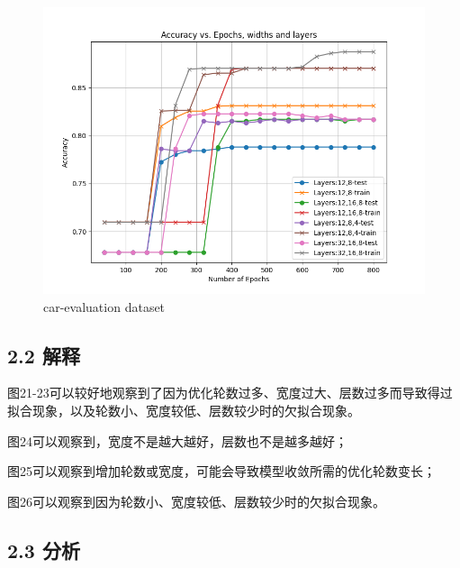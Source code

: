 \documentclass[8pt]{article}
\begin{document}
\begin{figure}[H]
    \begin{minipage}{0.32\textwidth}
        \centering
        \includegraphics[width=\textwidth]{../Prob2/out/task4/car/AccVsLayer_maxe800_layer_1031_175600.png}
        \caption{car-evaluation dataset}
        \label{fig:AccVsLayer_maxe800_layer_1031_175600 on car evaluation dataset}
    \end{minipage}
\end{figure}

\subsection*{2.2 解释}

图21-23可以较好地观察到了因为优化轮数过多、宽度过大、层数过多而导致得过拟合现象，以及轮数小、宽度较低、层数较少时的欠拟合现象。

图24可以观察到，宽度不是越大越好，层数也不是越多越好；

图25可以观察到增加轮数或宽度，可能会导致模型收敛所需的优化轮数变长；

图26可以观察到因为轮数小、宽度较低、层数较少时的欠拟合现象。

\subsection*{2.3 分析}
\end{document}

